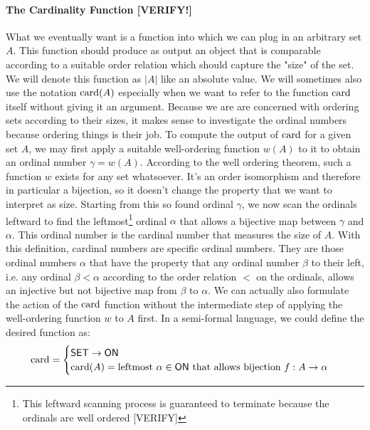 \paragraph{The Cardinality Function [VERIFY!]}
What we eventually want is a function into which we can plug in an arbitrary set $A$. This function should produce as output an object that is comparable according to a suitable order relation which should capture the "size" of the set. We will denote this function as $|A|$ like an absolute value. We will sometimes also use the notation $\operatorname{card}(A)$ especially when we want to refer to the function $\operatorname{card}$ itself without giving it an argument. Because we are are concerned with ordering sets according to their sizes, it makes sense to investigate the ordinal numbers because ordering things is their job. To compute the output of $\operatorname{card}$ for a given set $A$, we may first apply a suitable well-ordering function $w(A)$ to it to obtain an ordinal number $\gamma = w(A)$. According to the well ordering theorem, such a function $w$ exists for any set whatsoever. It's an order isomorphism and therefore in particular a bijection, so it doesn't change the property that we want to interpret as size. Starting from this so found ordinal $\gamma$, we now scan the ordinals leftward to find the leftmost\footnote{This leftward scanning process is guaranteed to terminate because the ordinals are well ordered [VERIFY]} ordinal $\alpha$ that allows a bijective map between $\gamma$ and $\alpha$. This ordinal number is the cardinal number that measures the size of $A$. With this definition, cardinal numbers are specific ordinal numbers. They are those ordinal numbers $\alpha$ that have the property that any ordinal number $\beta$ to their left, i.e. any ordinal $\beta < \alpha$ according to the order relation $<$ on the ordinals, allows an injective but not bijective map from $\beta$ to $\alpha$. We can actually also formulate the action of the $\operatorname{card}$ function without the intermediate step of applying the well-ordering function $w$ to $A$ first. In a semi-formal language, we could define the desired function as:
\begin{equation}
\operatorname{card} = 
\begin{cases}
\mathsf{SET} \rightarrow \mathsf{ON} \\
\operatorname{card}(A) = \text{leftmost } \alpha \in \mathsf{ON} \text{ that allows bijection } 
           f: A \rightarrow \alpha
\end{cases}
\end{equation}
